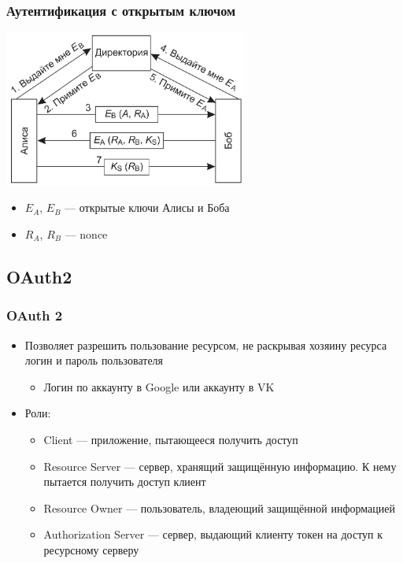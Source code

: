 \documentclass{../cscslides}
\begin{document}
    \begin{frame}
        \frametitle{Аутентификация с открытым ключом}
        \begin{center}
            \includegraphics[width=0.6\textwidth]{openKeyAuthentication.png}
        \end{center}
        \begin{itemize}
            \item $E_A$, $E_B$ --- открытые ключи Алисы и Боба
            \item $R_A$, $R_B$ --- nonce
        \end{itemize}
    \end{frame}

    \subsection{OAuth2}

    \begin{frame}
        \frametitle{OAuth 2}
        \begin{itemize}
            \item Позволяет разрешить пользование ресурсом, не раскрывая хозяину ресурса логин и пароль пользователя
            \begin{itemize}
                \item Логин по аккаунту в Google или аккаунту в VK
            \end{itemize}
            \item Роли:
            \begin{itemize}
                \item Client --- приложение, пытающееся получить доступ
                \item Resource Server --- сервер, хранящий защищённую информацию. К нему пытается получить доступ клиент
                \item Resource Owner --- пользователь, владеющий защищённой информацией
                \item Authorization Server --- сервер, выдающий клиенту токен на доступ к ресурсному серверу
            \end{itemize}
        \end{itemize}
    \end{frame}
\end{document}
